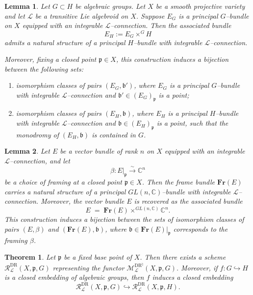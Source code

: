\documentclass[10pt,a4paper]{amsart}
\newtheorem{thm}{Theorem}
\newtheorem{lem}{Lemma}
\begin{document}
\begin{lem}\label{monodromy related thm-for-PB with-L-connection}
	Let $G \subset H$ be algebraic groups. Let $X$ be a smooth projective variety
	and let $\mathcal{L}$ be a transitive Lie algebroid on $X$.
	Suppose $E_{G}$ is a principal $G$--bundle on $X$ equipped with an integrable
	$\mathcal{L}$--connection. Then the associated bundle
	\[
	E_{H} := E_{G} \times^{G} H
	\]
	admits a natural structure of a principal $H$--bundle with integrable
	$\mathcal{L}$--connection.
	
	Moreover, fixing a closed point $\mathfrak{p} \in X$, this construction induces
	a bijection between the following sets:
	\begin{enumerate}
		\item isomorphism classes of pairs $(E_{G},\mathfrak{b}')$, where $E_{G}$ is a
		principal $G$--bundle with integrable $\mathcal{L}$--connection and
		$\mathfrak{b}' \in (E_{G})_{\mathfrak{p}}$ is a point;
		
		\item isomorphism classes of pairs $(E_{H},\mathfrak{b})$, where $E_{H}$ is a
		principal $H$--bundle with integrable $\mathcal{L}$--connection and
		$\mathfrak{b} \in (E_{H})_{\mathfrak{p}}$ is a point, such that the monodromy of
		$(E_{H},\mathfrak{b})$ is contained in $G$.
	\end{enumerate}
\end{lem}

\begin{lem}\label{lem:Fr-bundle-induce-L-connection}
	Let $E$ be a vector bundle of rank $n$ on $X$ equipped with an integrable
	$\mathcal{L}$--connection, and let
	\[
	\beta \colon E|_{\mathfrak{p}} \xrightarrow{\;\sim\;} \mathbb{C}^{n}
	\]
	be a choice of framing at a closed point $\mathfrak{p} \in X$.
	Then the frame bundle $\mathbf{Fr}(E)$ carries a natural structure of a
	principal $GL(n,\mathbb{C})$--bundle with integrable $\mathcal{L}$--connection.
	Moreover, the vector bundle $E$ is recovered as the associated bundle
	\[
	E \;=\; \mathbf{Fr}(E) \times^{GL(n,\mathbb{C})} \mathbb{C}^{n}.
	\]
	This construction induces a bijection between the sets of isomorphism classes
	of pairs $(E,\beta)$ and $(\mathbf{Fr}(E),\mathfrak{b})$, where
	$\mathfrak{b} \in \mathbf{Fr}(E)|_{\mathfrak{p}}$ corresponds to the
	framing $\beta$.
\end{lem}

\begin{thm}\label{thm: L-twisted - reprsentaion - space for L-connection}
	Let $\mathfrak{p}$ be a fixed base point of $X$. Then there exists a scheme $\mathcal{R}^{\text{DR}}_{\mathcal{L}}(X,\mathfrak{p},G)$
	representing the functor
	$\mathcal{M}^{\text{DR}^{\natural}}_{\mathcal{L}}(X,\mathfrak{p},G)$.
	Moreover, if $f \colon G \hookrightarrow H$ is a closed embedding of algebraic groups, then $f$ induces a closed embedding
	\[
	\mathcal{R}^{\text{DR}}_{\mathcal{L}}(X,\mathfrak{p},G)
	\hookrightarrow
	\mathcal{R}^{\text{DR}}_{\mathcal{L}}(X,\mathfrak{p},H).
	\]
\end{thm}
\end{document}
